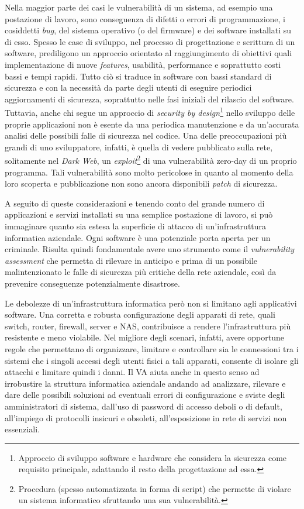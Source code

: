 \documentclass[target=bach,aauheader=]{thud}
\begin{document}
Nella maggior parte dei casi le vulnerabilità di un sistema, ad esempio una postazione di lavoro, sono conseguenza di difetti o errori di programmazione, i cosiddetti \textit{bug}, del sistema operativo (o del firmware) e dei software installati su di esso. Spesso le case di sviluppo, nel processo di progettazione e scrittura di un software, prediligono un approccio orientato al raggiungimento di obiettivi quali implementazione di nuove \textit{features}, usabilità, performance e soprattutto costi bassi e tempi rapidi. Tutto ciò si traduce in software con bassi standard di sicurezza e con la necessità da parte degli utenti di eseguire periodici aggiornamenti di sicurezza, soprattutto nelle fasi iniziali del rilascio del software. Tuttavia, anche chi segue un approccio di \textit{security by design}\footnote{Approccio di sviluppo software e hardware che considera la sicurezza come requisito principale, adattando il resto della progettazione ad essa.} nello sviluppo delle proprie applicazioni non è esente da una periodica manutenzione e da un’accurata analisi delle possibili falle di sicurezza nel codice. Una delle preoccupazioni più grandi di uno sviluppatore, infatti, è quella di vedere pubblicato sulla rete, solitamente nel \textit{Dark Web}, un \textit{exploit}\footnote{Procedura (spesso automatizzata in forma di script) che permette di violare un sistema informatico sfruttando una sua vulnerabilità.} di una vulnerabilità zero-day di un proprio programma. Tali vulnerabilità sono molto pericolose in quanto al momento della loro scoperta e pubblicazione non sono ancora disponibili \textit{patch} di sicurezza.

A seguito di queste considerazioni e tenendo conto del grande numero di applicazioni e servizi installati su una semplice postazione di lavoro, si può immaginare quanto sia estesa la superficie di attacco di un’infrastruttura informatica aziendale. Ogni software è una potenziale porta aperta per un criminale. Risulta quindi fondamentale avere uno strumento come il \textit{vulnerability assessment} che permetta di rilevare in anticipo e prima di un possibile malintenzionato le falle di sicurezza più critiche della rete aziendale, così da prevenire conseguenze potenzialmente disastrose.

Le debolezze di un’infrastruttura informatica però non si limitano agli applicativi software. Una corretta e robusta configurazione degli apparati di rete, quali switch, router, firewall, server e NAS, contribuisce a rendere l’infrastruttura più resistente e meno violabile. Nel migliore degli scenari, infatti, avere opportune regole che permettano di organizzare, limitare e controllare sia le connessioni tra i sistemi che i singoli accessi degli utenti fisici a tali apparati, consente di isolare gli attacchi e limitare quindi i danni. Il VA aiuta anche in questo senso ad irrobustire la struttura informatica aziendale andando ad analizzare, rilevare e dare delle possibili soluzioni ad eventuali errori di configurazione e sviste degli amministratori di sistema, dall’uso di password di accesso deboli o di default, all’impiego di protocolli insicuri e obsoleti, all’esposizione in rete di servizi non essenziali.
\end{document}
